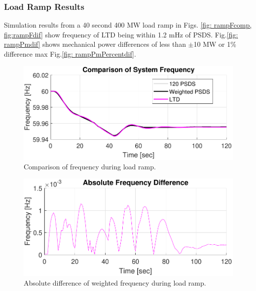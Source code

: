 \subsubsection{Load Ramp Results}
Simulation results from a 40 second 400 MW load ramp in Figs. \ref{fig: rampFcomp, fig:rampFdif} show frequency of LTD being within 1.2 mHz of PSDS.
Fig.\ref{fig: rampPmdif} shows mechanical power differences of less than $\pm$10 MW or 1\% difference max Fig.\ref{fig: rampPmPercentdif}.

\begin{figure}[!ht]
	\centering
	\includegraphics[width=\linewidth]{figures/miniWECC3ALTDrampF3}
	\caption{Comparison of frequency during load ramp.}
	\label{fig: rampFcomp}
\end{figure}

\begin{figure}[!ht]
	\centering
	\includegraphics[width=\linewidth]{figures/miniWECC3ALTDrampRelF}
	\caption{Absolute difference of weighted frequency during load ramp.}
	\label{fig: rampFdif}
\end{figure}

